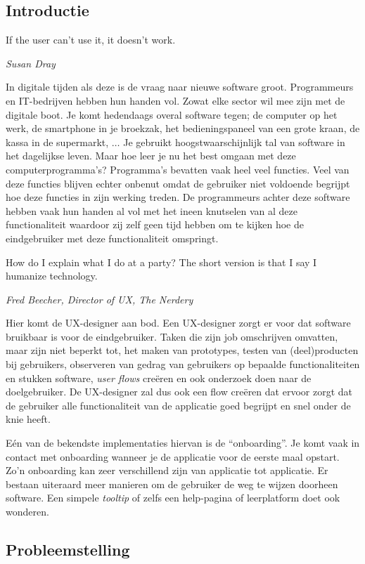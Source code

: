 \documentclass[a0,portrait]{a0poster}
\begin{document}
\begin{multicols}{2}
\color{HoGentAccent1} 
\section*{Introductie}
\color{black}
\color{black}

\epigraph{If the user can't use it, it doesn't work.}{\textit{Susan Dray}}

In digitale tijden als deze is de vraag naar nieuwe software groot. Programmeurs en IT-bedrijven hebben hun handen vol. Zowat elke sector wil mee zijn met de digitale boot. Je komt hedendaags overal software tegen; de computer op het werk, de smartphone in je broekzak, het bedieningspaneel van een grote kraan, de kassa in de supermarkt, $\dots$ Je gebruikt hoogstwaarschijnlijk tal van software in het dagelijkse leven. Maar hoe leer je nu het best omgaan met deze computerprogramma's? Programma's bevatten vaak heel veel functies. Veel van deze functies blijven echter onbenut omdat de gebruiker niet voldoende begrijpt hoe deze functies in zijn werking treden. De programmeurs achter deze software hebben vaak hun handen al vol met het ineen knutselen van al deze functionaliteit waardoor zij zelf geen tijd hebben om te kijken hoe de eindgebruiker met deze functionaliteit omspringt.

\epigraph{How do I explain what I do at a party? The short version is that I say I humanize technology.}{\textit{Fred Beecher, Director of UX, The Nerdery}}

Hier komt de UX-designer aan bod. Een UX-designer zorgt er voor dat software bruikbaar is voor de eindgebruiker. Taken die zijn job omschrijven omvatten, maar zijn niet beperkt tot, het maken van prototypes, testen van (deel)producten bij gebruikers, observeren van gedrag van gebruikers op bepaalde functionaliteiten en stukken software, \textit{user flows} creëren en ook onderzoek doen naar de doelgebruiker. De UX-designer zal dus ook een flow creëren dat ervoor zorgt dat de gebruiker alle functionaliteit van de applicatie goed begrijpt en snel onder de knie heeft.

Eén van de bekendste implementaties hiervan is de ``onboarding''. Je komt vaak in contact met onboarding wanneer je de applicatie voor de eerste maal opstart. Zo'n onboarding kan zeer verschillend zijn van applicatie tot applicatie.
Er bestaan uiteraard meer manieren om de gebruiker de weg te wijzen doorheen software. Een simpele \textit{tooltip} of zelfs een help-pagina of leerplatform doet ook wonderen.

\subsection*{Probleemstelling}


\end{multicols}
\end{document}
